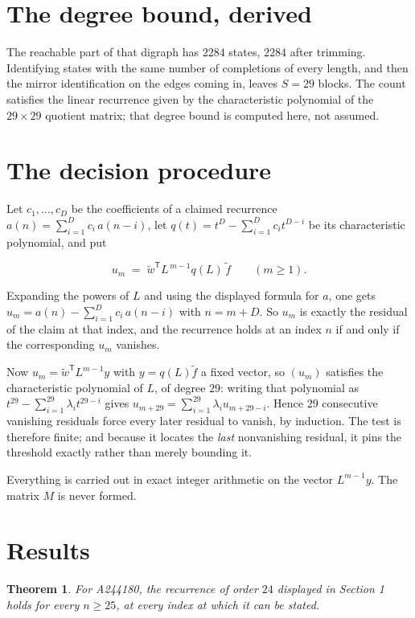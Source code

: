 \documentclass[11pt]{article}
\newtheorem{theorem}{Theorem}
\theoremstyle{definition}
\begin{document}
\section{The degree bound, derived}

The reachable part of that digraph has $2284$ states, $2284$ after trimming. Identifying states with the same number of completions of every length, and then the mirror identification on the edges coming in, leaves $S = 29$ blocks. The count satisfies the linear recurrence given by the characteristic polynomial of the $29\times29$ quotient matrix; that degree bound is computed here, not assumed.

\section{The decision procedure}

Let $c_1,\dots,c_D$ be the coefficients of a claimed recurrence $a(n) = \sum_{i=1}^{D} c_i\,a(n-i)$, let $q(t) = t^{D} - \sum_{i=1}^{D} c_i t^{D-i}$ be its characteristic polynomial, and put

\[u_m \;=\; \tilde w^{\mathsf T} L^{\,m-1} q(L)\,\tilde f \qquad (m \ge 1).\]

Expanding the powers of $L$ and using the displayed formula for $a$, one gets $u_m = a(n) - \sum_{i=1}^{D} c_i\,a(n-i)$ with $n = m + D$. So $u_m$ is exactly the residual of the claim at that index, and the recurrence holds at an index $n$ if and only if the corresponding $u_m$ vanishes.

Now $u_m = \tilde w^{\mathsf T} L^{m-1} y$ with $y = q(L)\tilde f$ a fixed vector, so $(u_m)$ satisfies the characteristic polynomial of $L$, of degree $29$: writing that polynomial as $t^{29} - \sum_{i=1}^{29} \lambda_i t^{29-i}$ gives $u_{m+29} = \sum_{i=1}^{29} \lambda_i u_{m+29-i}$. Hence $29$ consecutive vanishing residuals force every later residual to vanish, by induction. The test is therefore finite; and because it locates the {\itshape last} nonvanishing residual, it pins the threshold exactly rather than merely bounding it.

Everything is carried out in exact integer arithmetic on the vector $L^{m-1}y$. The matrix $M$ is never formed.

\section{Results}

\begin{theorem} For A244180, the recurrence of order $24$ displayed in Section 1 holds for every $n \ge 25$, at every index at which it can be stated.\end{theorem}
\end{document}
